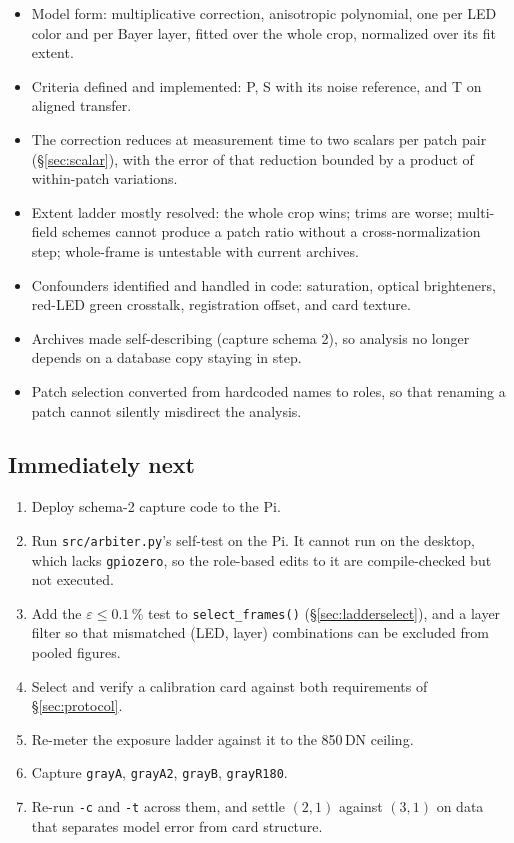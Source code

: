 \documentclass[11pt, a4paper]{article}
\newcommand{\code}[1]{\texttt{#1}}
\newcommand{\pct}{\,\%}
\begin{document}
\begin{itemize}[nosep]
  \item Model form:
        multiplicative correction,
        anisotropic polynomial,
        one per LED color and per Bayer layer,
        fitted over the whole crop,
        normalized over its fit extent.
  \item Criteria defined and implemented:
        P, S with its noise reference, and T on aligned transfer.
  \item The correction reduces at measurement time
        to two scalars per patch pair (\S\ref{sec:scalar}),
        with the error of that reduction bounded
        by a product of within-patch variations.
  \item Extent ladder mostly resolved:
        the whole crop wins;
        trims are worse;
        multi-field schemes cannot produce a patch ratio
        without a cross-normalization step;
        whole-frame is untestable with current archives.
  \item Confounders identified and handled in code:
        saturation, optical brighteners, red-LED green crosstalk,
        registration offset,
        and card texture.
  \item Archives made self-describing (capture schema 2),
        so analysis no longer depends on a database copy
        staying in step.
  \item Patch selection converted from hardcoded names to roles,
        so that renaming a patch cannot silently misdirect the analysis.
\end{itemize}

\subsection{Immediately next}

\begin{enumerate}[nosep]
  \item Deploy schema-2 capture code to the Pi.
  \item Run \code{src/arbiter.py}'s self-test on the Pi.
        It cannot run on the desktop, which lacks \code{gpiozero},
        so the role-based edits to it are compile-checked
        but not executed.
  \item Add the $\varepsilon \le 0.1\pct$ test to
        \code{select\_frames()} (\S\ref{sec:ladderselect}),
        and a layer filter so that mismatched
        (LED, layer) combinations can be excluded from pooled figures.
  \item Select and verify a calibration card
        against both requirements of \S\ref{sec:protocol}.
  \item Re-meter the exposure ladder against it to the 850\,DN ceiling.
  \item Capture \code{grayA}, \code{grayA2}, \code{grayB},
        \code{grayR180}.
  \item Re-run \code{-c} and \code{-t} across them,
        and settle $(2,1)$ against $(3,1)$
        on data that separates model error from card structure.
\end{enumerate}
\end{document}
